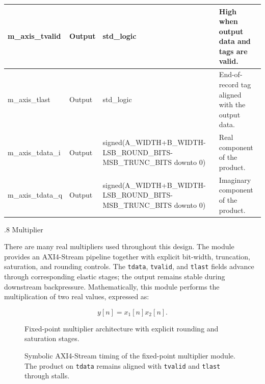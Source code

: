 \begin{table}[H]
\begin{center}
\begin{tabularx}{\textwidth}{|L{0.24\textwidth}|L{0.13\textwidth}|L{0.28\textwidth}|Y|}
\hline
m\_axis\_tvalid & Output & std\_logic & High when output data and tags are valid. \\
\hline
m\_axis\_tlast & Output & std\_logic & End-of-record tag aligned with the output data. \\
\hline
m\_axis\_tdata\_i & Output & signed(\newline A\_WIDTH+B\_WIDTH- \newline LSB\_ROUND\_BITS- \newline MSB\_TRUNC\_BITS downto 0) & Real component of the product. \\
\hline
m\_axis\_tdata\_q & Output & signed(\newline A\_WIDTH+B\_WIDTH- \newline LSB\_ROUND\_BITS- \newline MSB\_TRUNC\_BITS downto 0) & Imaginary component of the product. \\
\hline
\end{tabularx}
\end{center}
\end{table}

%
%
\bigskip
{}
.8  \quad Multiplier

There are many real multipliers used throughout this design.  The module provides an AXI4-Stream pipeline together with explicit bit-width, truncation, saturation, and rounding controls.  The \texttt{tdata}, \texttt{tvalid}, and \texttt{tlast} fields advance through corresponding elastic stages; the output remains stable during downstream backpressure.  Mathematically, this module performs the multiplication of two real values, expressed as:

\begin{equation}
y[n]=x_{1}[n]x_{2}[n].
\end{equation}

\begin{figure}[H]
\begin{center}
\resizebox{\textwidth}{!}{}
\caption{Fixed-point multiplier architecture with explicit rounding and saturation stages.}
\label{fig:multiplier}
\end{center}
\end{figure}

\begin{figure}[H]
\begin{center}
\resizebox{0.96\textwidth}{!}{}
\caption{Symbolic AXI4-Stream timing of the fixed-point multiplier module. The product on \texttt{tdata} remains aligned with \texttt{tvalid} and \texttt{tlast} through stalls.}
\label{fig:0_GenericMult}
\end{center}
\end{figure}

